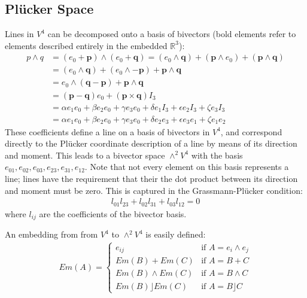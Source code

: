 \documentclass[a4paper, 10pt]{article}
\begin{document}
\subsection{Pl\"{u}cker Space}
Lines in $V^4$ can be decomposed onto a basis of bivectors (bold elements refer
to elements described entirely in the embedded $\mathbb{R}^3$):
\begin{align*}
   p \wedge q &= (e_0 + \mathbf{p}) \wedge (e_0 + \mathbf{q}) = (e_0 \wedge \mathbf{q}) + (\mathbf{p} \wedge e_0) + (\mathbf{p} \wedge \mathbf{q}) \\
         &= (e_0 \wedge \mathbf{q}) + (e_0 \wedge - \mathbf{p}) + \mathbf{p} \wedge \mathbf{q} \\
         &= e_0 \wedge (\mathbf{q} - \mathbf{p}) + \mathbf{p} \wedge \mathbf{q} \\
         &= (\mathbf{p} - \mathbf{q}) e_0 + (\mathbf{p} \times \mathbf{q}) I_3 \\
         &= \alpha e_1 e_0 + \beta e_2 e_0 + \gamma e_3 e_0 + \delta e_1 I_3 +
         \epsilon e_2 I_3 + \zeta e_3 I_3 \\
         &= \alpha e_1 e_0 + \beta e_2 e_0 + \gamma e_3 e_0 + \delta e_2 e_3 +
         \epsilon e_3 e_1 + \zeta e_1 e_2
\end{align*}
These coefficients define a line on a basis of bivectors in $V^4$, and
correspond directly to the Pl\"{u}cker coordinate description of a line by means
of its direction and moment. This leads to a bivector space $\wedge^2 V^4$ with
the basis ${e_{01}, e_{02}, e_{03}, e_{23}, e_{31}, e_{12}}$. Note that not
every element on this basis represents a line; lines have the requirement that
their the dot product between its direction and moment must be zero. This is
captured in the Grassmann-Pl\"{u}cker condition:
\begin{align*}
  l_{01} l_{23} + l_{02} l_{31} + l_{03} l_{12} = 0
\end{align*}
where $l_{ij}$ are the coefficients of the bivector basis.

An embedding from from $V^4$ to $\wedge^2 V^4$ is easily defined:
\begin{align*}
Em(A) =
\begin{cases}
  e_{ij} & \text{if } A = e_i \wedge e_j \\
  Em(B) + Em(C) & \text{if } A = B + C \\
  Em(B) \wedge Em(C) & \text{if } A = B \wedge C \\
  Em(B) \rfloor Em(C) & \text{if } A = B \rfloor C
\end{cases}
\end{align*}
\end{document}
